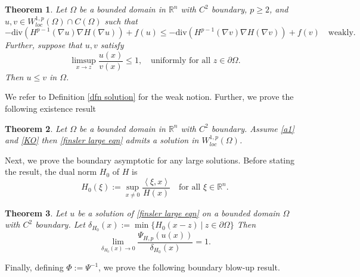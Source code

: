 \documentclass[11pt]{amsart}
\newtheorem{theorem}{Theorem}[section]
\newcommand{\rn}{\mathbb{R}^{n}}
\newcommand{\R}{\mathbb{R}}
\newcommand{\Fin}[1]{H^{p-1}(\nabla #1)\nabla H(\nabla #1)}
\numberwithin{equation}{section}
\begin{document}
\begin{theorem}\label{comparison principle}
    Let $\Omega$ be a bounded domain in $\rn$ with $C^{2}$ boundary, $p\geq 2$, and $u,v\in W_{loc}^{1,p}(\Omega)\cap C(\Omega)$ such that 
    \begin{equation}\label{ineq for comp princ}
       - \text{div}\left(\Fin{u}\right)+f(u)\leq -\text{div}\left(\Fin{v}\right)+f(v) \quad\text{weakly}.
    \end{equation}
  Further, suppose that $u,v$ satisfy 
    \begin{equation}\label{boundary condition for comp princ}
        \limsup_{x\to z}\frac{u(x)}{v(x)}\leq 1,\quad \text{uniformly for all }z\in \partial\Omega.
    \end{equation}
    Then $u\leq v$ in $\Omega$.
    \end{theorem}
 We refer to Definition \ref{dfn solution} for the weak notion. Further, we prove the following existence result
  \begin{theorem}\label{main theorem existence}
     Let $\Omega$ be a bounded domain in $\rn$ with $C^{2}$ boundary. Assume \ref{a1}
 and \ref{KO} then \eqref{finsler large eqn} admits a solution in $W^{1,p}_{loc}(\Omega)$.
 \end{theorem}
 Next, we prove the boundary asymptotic for any large solutions. Before stating the result, the dual norm $H_{0}$ of $H$ is 
\begin{equation}\label{dual dfn}
    H_{0}\left(\xi\right):=\displaystyle\sup_{x\neq 0}\frac{\left<\xi, x\right>}{H\left(x\right)} \quad \text{for all } \xi\in \R^{n}.
\end{equation}
 \begin{theorem}\label{dual asym}
   Let $u$ be a solution of \eqref{finsler large eqn} on a bounded domain $\Omega$ with $C^{2}$ boundary. Let $\delta_{H_{0}}(x):=\min\{H_{0}(x-z)~|~z\in \partial\Omega\}$ %
    Then
       \begin{equation*}
        \lim_{\delta_{H_{0}}(x)\to 0}\frac{\Psi_{H,p}(u(x))}{\delta_{H_{0}}(x)}= 1.
    \end{equation*}   
 \end{theorem}
 Finally, defining $\Phi:=\Psi^{-1}$, we prove the following boundary blow-up result.
\end{document}
